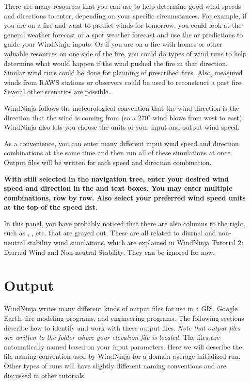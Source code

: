 \documentclass[12pt]{article}
\begin{document}
There are many resources that you can use to help determine good wind speeds and directions to enter, depending on your specific circumstances.  
For example, if you are on a fire and want to predict winds for tomorrow, you could look at the general weather forecast or a spot weather forecast and use the  or  predictions to guide your WindNinja inputs.  
Or if you are on a fire with homes or other valuable resources on one side of the fire, you could do  types of wind runs to help determine what would happen if the wind pushed the fire in that direction.  
Similar  wind runs could be done for planning of prescribed fires.  Also, measured winds from RAWS stations or observers could be used to reconstruct a past fire.  
Several other scenarios are possible…

WindNinja follows the meteorological convention that the wind direction is the direction that the wind is coming from (so a $270^{\circ}$  wind blows from west to east).  
WindNinja also lets you choose the units of your input and output wind speed.

As a convenience, you can enter many different input wind speed and direction combinations at the same time and then run all of these simulations at once.  
Output files will be written for each speed and direction combination.

\textbf{\color{red} With  still selected in the navigation tree, enter your desired wind speed and direction in the  and  text boxes.  You may enter multiple combinations, row by row.  Also select your preferred wind speed units at the top of the speed list.}

In this panel, you have probably noticed that there are also columns to the right, such as , , etc. that are grayed out.  
These are all related to diurnal and non-neutral stability wind simulations, which are explained in WindNinja Tutorial 2: Diurnal Wind and Non-neutral Stability.  
They can be ignored for now.

\section{Output}

WindNinja writes many different kinds of output files for use in a GIS, Google Earth, fire modeling programs, and engineering programs.  
The following sections describe how to identify and work with these output files.  \textit{Note that output files are written to the folder where your elevation file is located.} 
The files are automatically named based on your input parameters.  Here we will describe the file naming convention used by WindNinja for a domain average initialized run.  
Other types of runs will have slightly different naming conventions and are discussed in other tutorials.
\end{document}
